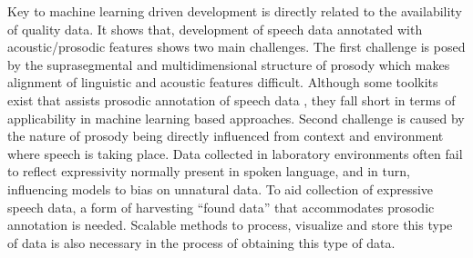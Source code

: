 
Key to machine learning driven development is directly related to the availability of quality data. It shows that, development of speech data annotated with acoustic/prosodic features shows two main challenges. The first challenge is posed by the suprasegmental and multidimensional structure of prosody which makes alignment of linguistic and acoustic features difficult. Although some toolkits exist that assists prosodic annotation of speech data \citep{Rosenberg10}, they fall short in terms of applicability in machine learning based approaches. Second challenge is caused by the nature of prosody being directly influenced from context and environment where speech is taking place. Data collected in laboratory environments often fail to reflect expressivity normally present in spoken language, and in turn, influencing models to bias on unnatural data. To aid collection of expressive speech data, a form of harvesting ``found data'' that accommodates prosodic annotation is needed. Scalable methods to process, visualize and store this type of data is also necessary in the process of obtaining this type of data.


